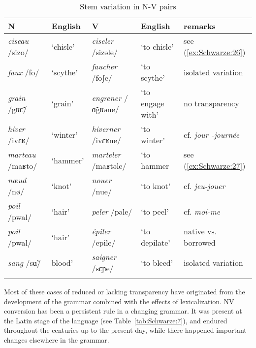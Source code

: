 \documentclass[output=paper]{langsci/langscibook}
\begin{document}
\begin{table}\resizebox{\linewidth}{!}
{
\begin{tabular}[c]{@{}lllll@{}}
\lsptoprule
{N} & {English} & {V} & {English} &
{remarks}\\
\midrule

\emph{ciseau} /sizo/ & `chisle' & \emph{ciseler} /sizǝle/ & `to chisle'
& see (\ref{ex:Schwarze:26})\\
\emph{faux} /fo/ & `scythe' & \emph{faucher} /foʃe/ & `to scythe' &
isolated variation\\
\emph{grain} /gʁɛ̃/ & `grain' & \emph{engrener} /ɑ̃gʁəne/ & `to engage with' & no transparency\\
\emph{hiver} /ivɛʁ/ & `winter' & \emph{hiverner} /ivɛʁne/ & `to winter'
& cf. \emph{jour -journée}\\
\emph{marteau} /maʁto/ & `hammer' & \emph{marteler} /maʁtǝle/ & `to hammer & see (\ref{ex:Schwarze:27})\\
\emph{nœud} /nø/ & `knot' & \emph{nouer} /nue/ & `to knot' & cf.
\emph{jeu-jouer}\\
\emph{poil} /pwal/ & `hair' & \emph{peler} /pǝle/ & `to peel' & cf.
\emph{moi-me}\\
\emph{poil} /pwal/ & `hair' & \emph{épiler} /epile/ & `to depilate' &
native vs. borrowed\\
\emph{sang} /sɑ̃/ & blood' & \emph{saigner} /sɛɲe/ & `to bleed' &
isolated variation\\
\lspbottomrule
\end{tabular}}
\caption{Stem variation in N-V pairs}
\label{tab:Schwarze:6}
\end{table}

Most of these cases of reduced or lacking transparency have originated from the development of the grammar combined with the effects of lexicalization. N\textrightarrow{}V conversion has been a persistent rule in a changing grammar. It was present at the Latin stage of the language (see Table~\ref{tab:Schwarze:7}), and endured throughout the centuries up to the present day, while there happened important changes elsewhere in the grammar.
\end{document}

